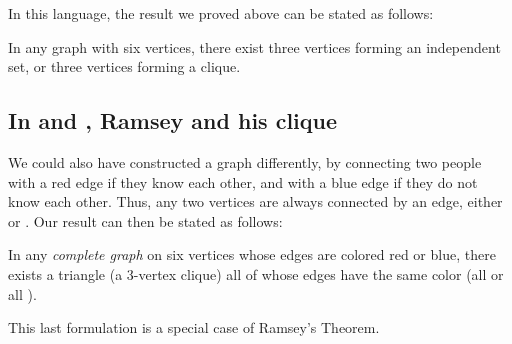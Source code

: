 \documentclass{amsart}
\begin{document}
\noindent
In this language, the result we proved above can be stated as follows:
\medskip
\begin{quoting}[leftmargin=5mm,rightmargin=5mm]\sf
  In any graph with six vertices, there exist three vertices forming
  an independent set, or three vertices forming a clique.
\end{quoting}
\medskip

\subsection{In  and , Ramsey and his clique}

We could also have constructed a graph differently, by connecting two
people with a red edge if they know each other, and with a blue edge
if they do not know each other. Thus, any two vertices are always
connected by an edge, either  or . Our result can
then be stated as follows:
\medskip
\begin{quoting}[leftmargin=5mm,rightmargin=5mm]\sf
  In any \emph{complete graph}%
  on six vertices whose edges are colored red or blue, there exists a
  triangle (a 3-vertex clique) all of whose edges have the same color
  (all  or all ).
\end{quoting}
\medskip
This last formulation is a special case of Ramsey’s Theorem.
\end{document}

